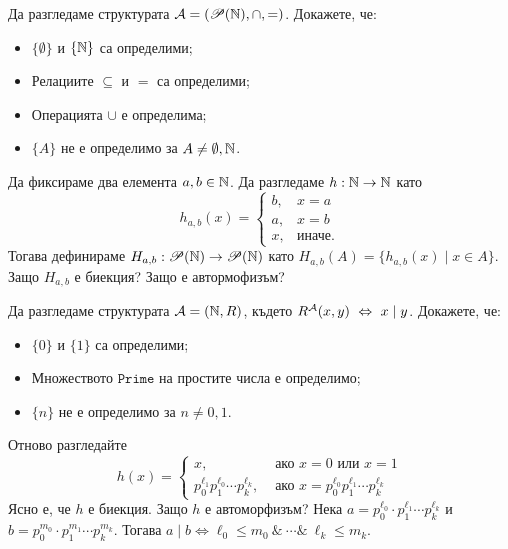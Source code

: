 \begin{problem}
  Да разгледаме структурата $\mathcal{A} = (\mathscr{P}(\mathbb{N}), \cap, =)$.  Докажете, че:
  \begin{itemize}
  \item
    $\{\emptyset\}$ и $\{\mathbb{N}\}$ са определими;
  \item
    Релациите $\subseteq$ и $=$ са определими;
  \item
    Операцията $\cup$ е определима;
  \item
    $\{A\}$ не е определимо за $A \neq \emptyset, \mathbb{N}$.
  \end{itemize}
\end{problem}
\begin{hint}
  Да фиксираме два елемента $a,b\in\mathbb{N}$.
  Да разгледаме $h:\mathbb{N} \to \mathbb{N}$ като
  \[h_{a,b}(x) =
    \begin{cases}
      b, & x = a\\
      a, & x = b\\
      x, & \text{иначе}.
    \end{cases}\]
  Тогава дефинираме $H_{a,b}:\mathscr{P}(\mathbb{N}) \to \mathscr{P}(\mathbb{N})$ като
  $H_{a,b}(A) = \{h_{a,b}(x) \mid x \in A\}$.
  Защо $H_{a,b}$ е биекция? Защо е автормофизъм?
\end{hint}

\begin{problem}
  Да разгледаме структурата $\mathcal{A} = (\mathbb{N}, R)$, където $R^{\mathcal{A}}(x,y) \ \Leftrightarrow\  x \mid y$.
  Докажете, че:
  \begin{itemize}
  \item
    $\{0\}$ и $\{1\}$ са определими;
  \item
    Множеството $\texttt{Prime}$ на простите числа е определимо;
  \item
    $\{n\}$ не е определимо за $n \neq 0,1$.
  \end{itemize}
\end{problem}
\begin{hint}
  Отново разгледайте
  \[h(x) =
    \begin{cases}
      x, & \text{ ако }x = 0 \text{ или } x = 1\\
      p^{\ell_1}_0p^{\ell_0}_1\cdots p^{\ell_k}_k, & \text{ ако }x = p^{\ell_0}_0 p^{\ell_1}_1 \cdots p^{\ell_k}_k
    \end{cases}\]
  Ясно е, че $h$ е биекция. Защо $h$ е автоморфизъм?
  Нека $a = p^{\ell_0}_0 \cdot p^{\ell_1}_1 \cdots p^{\ell_k}_k$ и $b = p^{m_0}_0 \cdot p^{m_1}_1 \cdots p^{m_k}_k$. Тогава
  $a \mid b \iff \ell_0 \leq m_0\ \&\ \cdots \&\ \ell_k \leq m_k$.
\end{hint}

